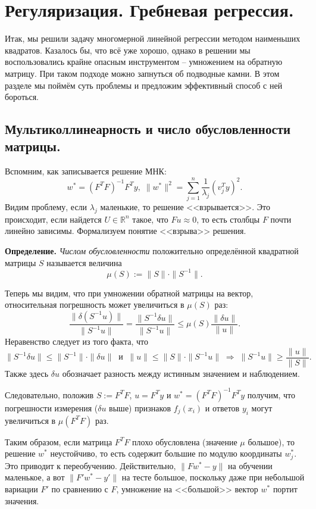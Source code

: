 \section*{Регуляризация. Гребневая регрессия.}

Итак, мы решили задачу многомерной линейной регрессии методом наименьших квадратов. Казалось бы, что всё уже хорошо, однако в решении мы воспользовались крайне опасным инструментом -- умножением на обратную матрицу. При таком подходе можно запнуться об подводные камни. В этом разделе мы поймём суть проблемы и предложим эффективный способ с ней бороться.

\subsection*{Мультиколлинеарность и число обусловленности матрицы.}
Вспомним, как записывается решение МНК:
$$w^* = (F^T F)^{-1} F^T y, \; \|w^*\|^2 = \sum_{j=1}^n \frac{1}{\lambda_j}(v_j^T y)^2.$$
Видим проблему, если $\lambda_j$ маленькие, то решение <<взрывается>>. Это происходит, если найдется $U \in \mathbb{R}^n$ такое, что $Fu \approx 0$, то есть столбцы $F$ почти линейно зависимы. Формализуем понятие <<взрыва>> решения.

\noindent\textbf{Определение.} \textit{Числом обусловленности} 
положительно определённой квадратной матрицы $S$ называется величина
$$\mu(S) := \|S\| \cdot \|S^{-1}\|.$$

Теперь мы видим, что при умножении обратной матрицы на вектор, относительная погрешность может увеличиться в $\mu(S)$ раз:
$$\frac{\|\delta(S^{-1}u)\|}{\|S^{-1}u\|} = \frac{\|S^{-1} \delta u\|}{\|S^{-1}u\|} \leqslant \mu(S)\frac{\|\delta u\|}{\|u\|}.$$
Неравенство следует из того факта, что
$$\|S^{-1}\delta u\| \leqslant \|S^{-1}\| \cdot \|\delta u\| \;\; \text{и} \;\; \|u\| \leqslant \|S\| \cdot \|S^{-1}u\| \; \Rightarrow \; \|S^{-1}u\| \geqslant \frac{\|u\|}{\|S\|}.$$
Также здесь $\delta u$ обозначает разность между истинным значением и наблюдением.

Следовательно, положив $S := F^T F$, $u = F^T y$ и $w^* = (F^T F)^{-1} F^T y$ получим, что погрешности измерения ($\delta u$ выше) признаков $f_j(x_i)$ и ответов $y_i$ могут увеличиться в $\mu(F^T F)$ раз.

Таким образом, если матрица $F^TF$ плохо обусловлена (значение $\mu$ большое), то решение $w^*$ неустойчиво, то есть содержит большие по модулю координаты $w_j^*$. Это приводит к переобучению. Действительно, $\|Fw^* - y\|$ на обучении маленькое, а вот $\|F'w^* - y'\|$ на тесте большое, поскольку даже при небольшой вариации $F'$ по сравнению с $F$, умножение на <<большой>> вектор $w^*$ портит значения.

